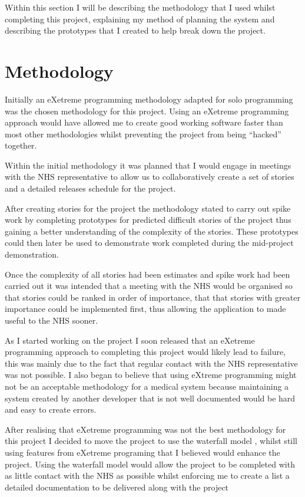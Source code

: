 Within this section I will be describing the methodology that I used whilst completing this project, explaining my method of planning the system and describing the prototypes that I created to help break down the project.

\section{Methodology}

Initially an eXetreme programming \cite{xp} methodology adapted for solo programming was the chosen methodology for this project. Using an eXetreme programming approach would have allowed me to create good working software faster than most other methodologies whilst preventing the project from being “hacked” together.

Within the initial methodology it was planned that I would engage in meetings with the NHS representative to allow us to collaboratively create a set of stories and a detailed releases schedule for the project. 

After creating stories for the project the methodology stated to carry out spike work by completing prototypes for predicted difficult stories of the project thus gaining a better understanding of the complexity of the stories. These prototypes could then later be used to demonstrate work completed during the mid-project demonstration.

Once the complexity of all stories had been estimates and spike work had been carried out it was intended that a meeting with the NHS would be organised so that stories could be ranked in order of importance, that that stories with greater importance could be implemented first, thus allowing the application to made useful to the NHS sooner.

As I started working on the project I soon released that an eXetreme programming approach to completing this project would likely lead to failure, this was mainly due to the fact that regular contact with the NHS representative was not possible.  I also began to believe that using eXtreme programming \cite{xp} might not be an acceptable methodology for a medical system because maintaining a system created by another developer that is not well documented would be hard and easy to create errors.

After realising that eXetreme programming \cite{xp} was not the best methodology for this project I decided to move the project to use the waterfall model \cite{waterfall}, whilst still using features from eXetreme programing \cite{xp} that I believed would enhance the project. Using the waterfall model \cite{waterfall} would allow the project to be completed with as little contact with the NHS as possible whilst enforcing me to create a list a detailed documentation to be delivered along with the project

